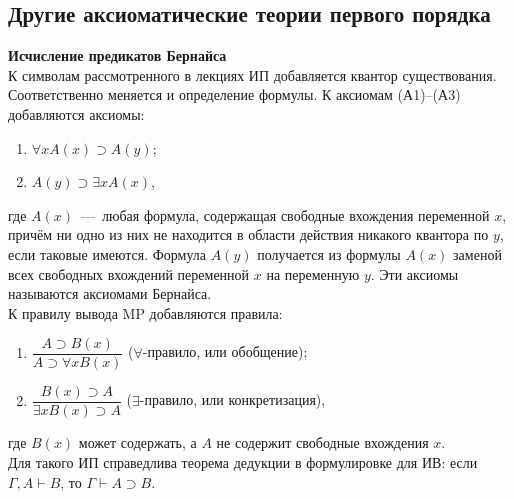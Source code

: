\subsection{Другие аксиоматические теории первого порядка}
\textbf{Исчисление предикатов Бернайса} \\
К символам рассмотренного в лекциях ИП добавляется квантор существования. Соответственно меняется и определение формулы. К аксиомам (А1)--(А3) добавляются аксиомы:
\begin{enumerate}[label=(Б\arabic*)]
    \item $\forall xA(x) \supset A(y)$;
    \item $A(y) \supset \exists xA(x)$,
\end{enumerate}
где $A(x)$~---~любая формула, содержащая свободные вхождения переменной $x$, причём ни одно из них не находится в области действия никакого квантора по $y$, если таковые имеются. Формула $A(y)$ получается из формулы $A(x)$ заменой всех свободных вхождений переменной $x$ на переменную $y$. Эти аксиомы называются аксиомами Бернайса. \\
К правилу вывода MP добавляются правила:
\begin{enumerate}
    \item $\dfrac{A \supset B(x)}{A \supset \forall xB(x)}$ ($\forall$-правило, или обобщение);
    \item $\dfrac{B(x) \supset A}{\exists xB(x) \supset A}$ ($\exists$-правило, или конкретизация),
\end{enumerate}
где $B(x)$ может содержать, а $A$ не содержит свободные вхождения $x$. \\
Для такого ИП справедлива теорема дедукции в формулировке для ИВ: если $\Gamma, A \vdash B$, то $\Gamma \vdash A \supset B$.


